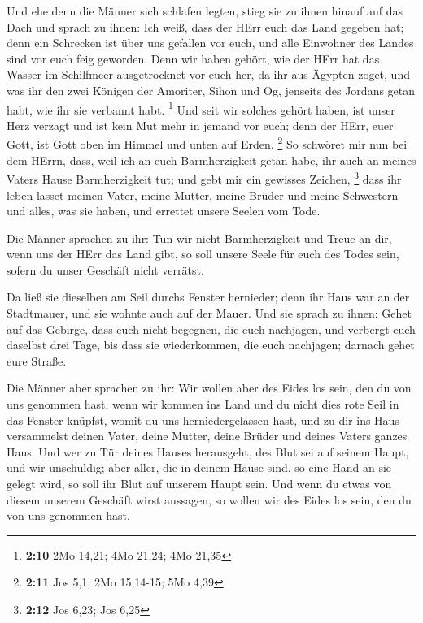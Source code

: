  Und ehe denn die Männer sich schlafen legten, stieg sie
zu ihnen hinauf auf das Dach  und sprach zu ihnen: Ich
weiß, dass der HErr euch das Land gegeben hat; denn ein Schrecken ist
über uns gefallen vor euch, und alle Einwohner des Landes sind vor euch
feig geworden.  Denn wir haben gehört, wie der HErr hat
das Wasser im Schilfmeer ausgetrocknet vor euch her, da ihr aus Ägypten
zoget, und was ihr den zwei Königen der Amoriter, Sihon und Og, jenseits
des Jordans getan habt, wie ihr sie verbannt habt. \footnote{\textbf{2:10}
  2Mo 14,21; 4Mo 21,24; 4Mo 21,35}  Und seit wir solches
gehört haben, ist unser Herz verzagt und ist kein Mut mehr in jemand vor
euch; denn der HErr, euer Gott, ist Gott oben im Himmel und unten auf
Erden. \footnote{\textbf{2:11} Jos 5,1; 2Mo 15,14-15; 5Mo 4,39}
 So schwöret mir nun bei dem HErrn, dass, weil ich an
euch Barmherzigkeit getan habe, ihr auch an meines Vaters Hause
Barmherzigkeit tut; und gebt mir ein gewisses Zeichen, \footnote{\textbf{2:12}
  Jos 6,23; Jos 6,25}  dass ihr leben lasset meinen
Vater, meine Mutter, meine Brüder und meine Schwestern und alles, was
sie haben, und errettet unsere Seelen vom Tode.

 Die Männer sprachen zu ihr: Tun wir nicht Barmherzigkeit
und Treue an dir, wenn uns der HErr das Land gibt, so soll unsere Seele
für euch des Todes sein, sofern du unser Geschäft nicht verrätst.

 Da ließ sie dieselben am Seil durchs Fenster hernieder;
denn ihr Haus war an der Stadtmauer, und sie wohnte auch auf der Mauer.
 Und sie sprach zu ihnen: Gehet auf das Gebirge, dass
euch nicht begegnen, die euch nachjagen, und verbergt euch daselbst drei
Tage, bis dass sie wiederkommen, die euch nachjagen; darnach gehet eure
Straße.

 Die Männer aber sprachen zu ihr: Wir wollen aber des
Eides los sein, den du von uns genommen hast,  wenn wir
kommen ins Land und du nicht dies rote Seil in das Fenster knüpfst,
womit du uns herniedergelassen hast, und zu dir ins Haus versammelst
deinen Vater, deine Mutter, deine Brüder und deines Vaters ganzes Haus.
 Und wer zu Tür deines Hauses herausgeht, des Blut sei
auf seinem Haupt, und wir unschuldig; aber aller, die in deinem Hause
sind, so eine Hand an sie gelegt wird, so soll ihr Blut auf unserem
Haupt sein.  Und wenn du etwas von diesem unserem
Geschäft wirst aussagen, so wollen wir des Eides los sein, den du von
uns genommen hast.

